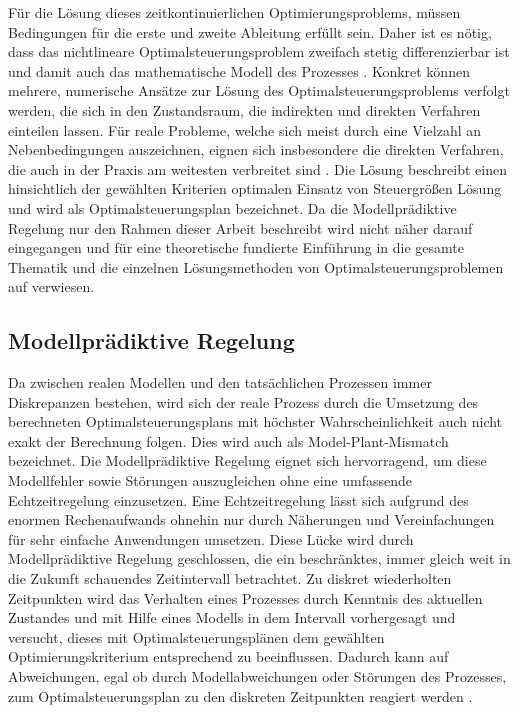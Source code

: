 Für die Lösung dieses zeitkontinuierlichen Optimierungsproblems, müssen Bedingungen für die erste und zweite Ableitung erfüllt sein. Daher ist es nötig, dass das nichtlineare Optimalsteuerungsproblem zweifach stetig differenzierbar ist und damit auch das mathematische Modell des Prozesses \cite[S.~21ff.]{di14}.
Konkret können mehrere, numerische Ansätze zur Lösung des Optimalsteuerungsproblems verfolgt werden, die sich in den Zustandsraum, die indirekten und direkten Verfahren einteilen lassen. Für reale Probleme, welche sich meist durch eine Vielzahl an Nebenbedingungen auszeichnen, eignen sich insbesondere die direkten Verfahren, die auch in der Praxis am weitesten verbreitet sind \cite[S.~63]{di14}. Die Lösung beschreibt einen hinsichtlich der gewählten Kriterien optimalen Einsatz von Steuergrößen Lösung und wird als Optimalsteuerungsplan bezeichnet.
Da die Modellprädiktive Regelung nur den Rahmen dieser Arbeit beschreibt wird nicht näher darauf eingegangen und für eine theoretische fundierte Einführung in die gesamte Thematik und die einzelnen Lösungsmethoden von Optimalsteuerungsproblemen auf \cite{di14} verwiesen.

\subsection{Modellprädiktive Regelung}

Da zwischen realen Modellen und den tatsächlichen Prozessen immer Diskrepanzen bestehen, wird sich der reale Prozess durch die Umsetzung des berechneten Optimalsteuerungsplans mit höchster Wahrscheinlichkeit auch nicht exakt der Berechnung folgen. Dies wird auch als Model-Plant-Mismatch bezeichnet. Die Modellprädiktive Regelung eignet sich hervorragend, um diese Modellfehler sowie Störungen auszugleichen ohne eine umfassende Echtzeitregelung einzusetzen. Eine Echtzeitregelung lässt sich aufgrund des enormen Rechenaufwands ohnehin nur durch Näherungen und Vereinfachungen für sehr einfache Anwendungen umsetzen. Diese Lücke wird durch Modellprädiktive Regelung geschlossen, die ein beschränktes, immer gleich weit in die Zukunft schauendes Zeitintervall betrachtet. Zu diskret wiederholten Zeitpunkten wird das Verhalten eines Prozesses durch Kenntnis des aktuellen Zustandes und mit Hilfe eines Modells in dem Intervall vorhergesagt und versucht, dieses mit Optimalsteuerungsplänen dem gewählten Optimierungskriterium entsprechend zu beeinflussen. Dadurch kann auf Abweichungen, egal ob durch Modellabweichungen oder Störungen des Prozesses, zum Optimalsteuerungsplan zu den diskreten Zeitpunkten reagiert werden \cite[S.~71]{di14}.

